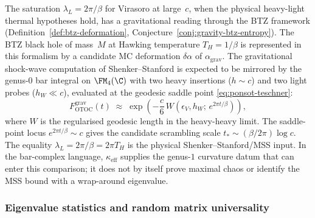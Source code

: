 \begin{remark}
\label{rem:saturation-bh}%
%
%
The saturation \(\lambda_L = 2\pi/\beta\) for Virasoro at
large~\(c\), when the physical heavy-light thermal hypotheses hold,
has a gravitational reading through the BTZ framework
(Definition~\ref{def:btz-deformation},
Conjecture~\ref{conj:gravity-btz-entropy}). The BTZ black hole of
mass~\(M\) at Hawking temperature \(T_H = 1/\beta\) is represented in
this formalism by a candidate MC deformation \(\delta\alpha\) of
\(\alpha_{\mathrm{grav}}\). The gravitational shock-wave computation
of Shenker--Stanford is expected to be mirrored by the genus-$0$ bar
integral on
$\FM_4(\C)$ with two heavy insertions ($h \sim c$) and two
light probes ($h_W \ll c$), evaluated at the geodesic
saddle point \eqref{eq:ponsot-teschner}:
\[
F_{\mathrm{OTOC}}^{\mathrm{grav}}(t)
\;\approx\;
\exp\!\left(
 -\frac{c}{6}\,W(\epsilon_V, h_W;\, e^{2\pi t/\beta})
\right),
\]
where $W$ is the regularised geodesic length in the heavy-heavy
limit. The saddle-point
locus \(e^{2\pi t/\beta} \sim c\) gives the candidate scrambling
scale \(t_* \sim (\beta/2\pi)\log c\). The equality
\(\lambda_L = 2\pi/\beta = 2\pi T_H\) is the physical
Shenker--Stanford/MSS input. In the bar-complex language,
\(\kappa_{\mathrm{eff}}\) supplies the genus-$1$ curvature datum that
can enter this comparison; it does not by itself prove maximal chaos
or identify the MSS bound with a wrap-around eigenvalue.
\end{remark}

\subsubsection*{Eigenvalue statistics and random matrix universality}

